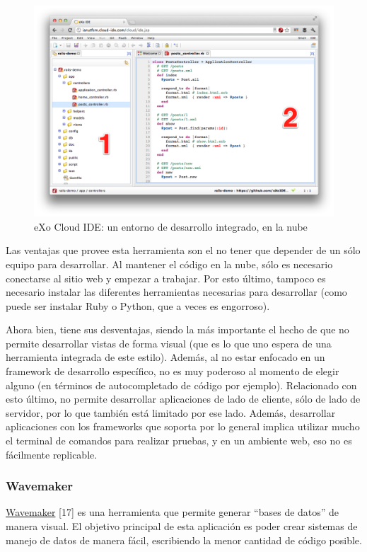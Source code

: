 \documentclass[12pt,titlepage,]{article}
\makeatletter
\def\maxwidth{\ifdim\Gin@nat@width>\linewidth\linewidth
\else\Gin@nat@width\fi}
\let\Oldincludegraphics\includegraphics
\renewcommand{\includegraphics}[1]{\Oldincludegraphics[width=\maxwidth]{#1}}
\makeatother
\begin{document}
\begin{figure}[htbp]
\centering
\includegraphics{figures/exo-ide-big.png}
\caption{eXo Cloud IDE: un entorno de desarrollo integrado, en la
nube\label{figure:exo-ide}}
\end{figure}

Las ventajas que provee esta herramienta son el no tener que depender de
un sólo equipo para desarrollar. Al mantener el código en la nube, sólo
es necesario conectarse al sitio web y empezar a trabajar. Por esto
último, tampoco es necesario instalar las diferentes herramientas
necesarias para desarrollar (como puede ser instalar Ruby o Python, que
a veces es engorroso).

Ahora bien, tiene sus desventajas, siendo la más importante el hecho de
que no permite desarrollar vistas de forma visual (que es lo que uno
espera de una herramienta integrada de este estilo). Además, al no estar
enfocado en un framework de desarrollo específico, no es muy poderoso al
momento de elegir alguno (en términos de autocompletado de código por
ejemplo). Relacionado con esto último, no permite desarrollar
aplicaciones de lado de cliente, sólo de lado de servidor, por lo que
también está limitado por ese lado. Además, desarrollar aplicaciones con
los frameworks que soporta por lo general implica utilizar mucho el
terminal de comandos para realizar pruebas, y en un ambiente web, eso no
es fácilmente replicable.

\subsubsection{Wavemaker}

\href{http://www.wavemaker.com/}{Wavemaker} {[}17{]} es una herramienta
que permite generar ``bases de datos'' de manera visual. El objetivo
principal de esta aplicación es poder crear sistemas de manejo de datos
de manera fácil, escribiendo la menor cantidad de código posible.
\end{document}
